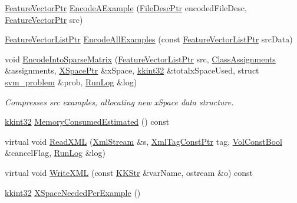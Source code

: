 \begin{DoxyCompactItemize}
\hyperlink{namespace_k_k_m_l_l_a0c5df3d48f45926fbc4fee04f5e3bc04}{Feature\+Vector\+Ptr} \hyperlink{class_k_k_m_l_l_1_1_feature_encoder_a7449052191dd87e2c5038abbccec7e73}{Encode\+A\+Example} (\hyperlink{namespace_k_k_m_l_l_aa0d0b6ab4ec18868a399b8455b05d914}{File\+Desc\+Ptr} encoded\+File\+Desc, \hyperlink{namespace_k_k_m_l_l_a0c5df3d48f45926fbc4fee04f5e3bc04}{Feature\+Vector\+Ptr} src)
\item 
\hyperlink{namespace_k_k_m_l_l_acf2ba92a3cf03e2b19674b24ff488ef6}{Feature\+Vector\+List\+Ptr} \hyperlink{class_k_k_m_l_l_1_1_feature_encoder_ad22b9ed7426ebd0126472917cde20138}{Encode\+All\+Examples} (const \hyperlink{namespace_k_k_m_l_l_acf2ba92a3cf03e2b19674b24ff488ef6}{Feature\+Vector\+List\+Ptr} src\+Data)
\item 
void \hyperlink{class_k_k_m_l_l_1_1_feature_encoder_ad8d410b25748ce3d86eaeaff7ee73bec}{Encode\+Into\+Sparse\+Matrix} (\hyperlink{namespace_k_k_m_l_l_acf2ba92a3cf03e2b19674b24ff488ef6}{Feature\+Vector\+List\+Ptr} src, \hyperlink{class_k_k_m_l_l_1_1_class_assignments}{Class\+Assignments} \&assignments, \hyperlink{namespace_k_k_m_l_l_abbdd347e3f7ba84af6a5452ef7a0cfef}{X\+Space\+Ptr} \&x\+Space, \hyperlink{namespace_k_k_b_a8fa4952cc84fda1de4bec1fbdd8d5b1b}{kkint32} \&totalx\+Space\+Used, struct \hyperlink{struct_s_v_m233_1_1svm__problem}{svm\+\_\+problem} \&prob, \hyperlink{class_k_k_b_1_1_run_log}{Run\+Log} \&log)
\begin{DoxyCompactList}\small\item\em Compresses \textquotesingle{}src\textquotesingle{} examples, allocating new \textquotesingle{}x\+Space\textquotesingle{} data structure. \end{DoxyCompactList}\item 
\hyperlink{namespace_k_k_b_a8fa4952cc84fda1de4bec1fbdd8d5b1b}{kkint32} \hyperlink{class_k_k_m_l_l_1_1_feature_encoder_aed7fd3271e7ce09181205874048ef9e8}{Memory\+Consumed\+Estimated} () const 
\item 
virtual void \hyperlink{class_k_k_m_l_l_1_1_feature_encoder_a4da98e7abffd3faaee30de359cb03ee8}{Read\+X\+ML} (\hyperlink{class_k_k_b_1_1_xml_stream}{Xml\+Stream} \&s, \hyperlink{namespace_k_k_b_a5f1b0b1667d79fec26deeff10c43df23}{Xml\+Tag\+Const\+Ptr} tag, \hyperlink{namespace_k_k_b_a7d390f568e2831fb76b86b56c87bf92f}{Vol\+Const\+Bool} \&cancel\+Flag, \hyperlink{class_k_k_b_1_1_run_log}{Run\+Log} \&log)
\item 
virtual void \hyperlink{class_k_k_m_l_l_1_1_feature_encoder_a22bc8ae1c1bf08f0411d929a4b707572}{Write\+X\+ML} (const \hyperlink{class_k_k_b_1_1_k_k_str}{K\+K\+Str} \&var\+Name, ostream \&o) const 
\item 
\hyperlink{namespace_k_k_b_a8fa4952cc84fda1de4bec1fbdd8d5b1b}{kkint32} \hyperlink{class_k_k_m_l_l_1_1_feature_encoder_abdf459cb6ec11bf1519a53643a24fdb8}{X\+Space\+Needed\+Per\+Example} ()
\end{DoxyCompactItemize}


